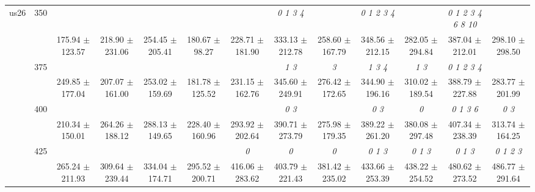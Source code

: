 \begin{table}[h]
{\begin{tabular}{
        ccccccccccccc}
 \multirow{4}{*}{us26} & \multirow{2}{*}{350}& & & & & & \textit{ 0 1 3 4 }& & \textit{ 0 1 2 3 4 }& & \textit{  0  1  2  3  4  6  8 10 }&  \\ 
 & & 175.94 $\pm$ 123.57& 218.90 $\pm$ 231.06& 254.45 $\pm$ 205.41& 180.67 $\pm$ 98.27& 228.71 $\pm$ 181.90& 333.13 $\pm$ 212.78& 258.60 $\pm$ 167.79& 348.56 $\pm$ 212.15& 282.05 $\pm$ 294.84& 387.04 $\pm$ 212.01& 298.10 $\pm$ 298.50 \\ 
 & \multirow{2}{*}{375}& \cellcolor[HTML]{EFEFEF} & \cellcolor[HTML]{EFEFEF} & \cellcolor[HTML]{EFEFEF} & \cellcolor[HTML]{EFEFEF} & \cellcolor[HTML]{EFEFEF} & \cellcolor[HTML]{EFEFEF} \textit{ 1 3 }& \cellcolor[HTML]{EFEFEF} \textit{ 3 }& \cellcolor[HTML]{EFEFEF} \textit{ 1 3 4 }& \cellcolor[HTML]{EFEFEF} \textit{ 1 3 }& \cellcolor[HTML]{EFEFEF} \textit{ 0 1 2 3 4 }& \cellcolor[HTML]{EFEFEF}  \\ 
 & & \cellcolor[HTML]{EFEFEF} 249.85 $\pm$ 177.04& \cellcolor[HTML]{EFEFEF} 207.07 $\pm$ 161.00& \cellcolor[HTML]{EFEFEF} 253.02 $\pm$ 159.69& \cellcolor[HTML]{EFEFEF} 181.78 $\pm$ 125.52& \cellcolor[HTML]{EFEFEF} 231.15 $\pm$ 162.76& \cellcolor[HTML]{EFEFEF} 345.60 $\pm$ 249.91& \cellcolor[HTML]{EFEFEF} 276.42 $\pm$ 172.65& \cellcolor[HTML]{EFEFEF} 344.90 $\pm$ 196.16& \cellcolor[HTML]{EFEFEF} 310.02 $\pm$ 189.54& \cellcolor[HTML]{EFEFEF} 388.79 $\pm$ 227.88& \cellcolor[HTML]{EFEFEF} 283.77 $\pm$ 201.99 \\ 
 & \multirow{2}{*}{400}& & & & & & \textit{ 0 3 }& & \textit{ 0 3 }& \textit{ 0 }& \textit{ 0 1 3 6 }& \textit{ 0 3 } \\ 
 & & 210.34 $\pm$ 150.01& 264.26 $\pm$ 188.12& 288.13 $\pm$ 149.65& 228.40 $\pm$ 160.96& 293.92 $\pm$ 202.64& 390.71 $\pm$ 273.79& 275.98 $\pm$ 179.35& 389.22 $\pm$ 261.20& 380.08 $\pm$ 297.48& 407.34 $\pm$ 238.39& 313.74 $\pm$ 164.25 \\ 
 & \multirow{2}{*}{425}& \cellcolor[HTML]{EFEFEF} & \cellcolor[HTML]{EFEFEF} & \cellcolor[HTML]{EFEFEF} & \cellcolor[HTML]{EFEFEF} & \cellcolor[HTML]{EFEFEF} \textit{ 0 }& \cellcolor[HTML]{EFEFEF} \textit{ 0 }& \cellcolor[HTML]{EFEFEF} \textit{ 0 }& \cellcolor[HTML]{EFEFEF} \textit{ 0 1 3 }& \cellcolor[HTML]{EFEFEF} \textit{ 0 1 3 }& \cellcolor[HTML]{EFEFEF} \textit{ 0 1 3 }& \cellcolor[HTML]{EFEFEF} \textit{ 0 1 2 3 } \\ 
 & & \cellcolor[HTML]{EFEFEF} 265.24 $\pm$ 211.93& \cellcolor[HTML]{EFEFEF} 309.64 $\pm$ 239.44& \cellcolor[HTML]{EFEFEF} 334.04 $\pm$ 174.71& \cellcolor[HTML]{EFEFEF} 295.52 $\pm$ 200.71& \cellcolor[HTML]{EFEFEF} 416.06 $\pm$ 283.62& \cellcolor[HTML]{EFEFEF} 403.79 $\pm$ 221.43& \cellcolor[HTML]{EFEFEF} 381.42 $\pm$ 235.02& \cellcolor[HTML]{EFEFEF} 433.66 $\pm$ 253.39& \cellcolor[HTML]{EFEFEF} 438.22 $\pm$ 254.52& \cellcolor[HTML]{EFEFEF} 480.62 $\pm$ 273.52& \cellcolor[HTML]{EFEFEF} 486.77 $\pm$ 291.64 \\ 

\end{tabular}}
\end{table}

